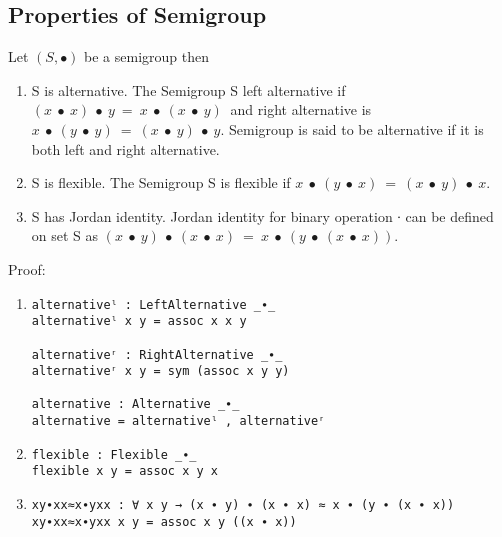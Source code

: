 \subsection{Properties of Semigroup}
Let $(S, ∙)$ be a semigroup then
\begin{enumerate}
\item S is alternative. The Semigroup S left alternative if \((x\ ∙\ x)\ ∙\ y\ =\ x\ ∙\ (x\ ∙\ y)\ \) and right alternative is
\(x\ ∙\ (y\ ∙\ y)\ =\ (x\ ∙\ y)\ ∙\ y\). Semigroup is
said to be alternative if it is both left and right alternative. 
\item S is flexible. The Semigroup S is flexible if \(x\ ∙\ (y\
∙\ x)\ =\ (x\ ∙\ y)\ ∙\ x\).
\item S has Jordan identity.  Jordan identity for binary operation ∙ can be
defined on set S as \((x\ ∙\ y)\ ∙\ (x\ ∙\ x)\ =\
x\ ∙\ (y\ ∙\ (x\ ∙\ x)). \)
\end{enumerate}
Proof:
\begin{enumerate}
\item
\begin{verbatim}
alternativeˡ : LeftAlternative _∙_
alternativeˡ x y = assoc x x y

alternativeʳ : RightAlternative _∙_
alternativeʳ x y = sym (assoc x y y)

alternative : Alternative _∙_
alternative = alternativeˡ , alternativeʳ
\end{verbatim}
 \item
\begin{verbatim}
flexible : Flexible _∙_
flexible x y = assoc x y x
\end{verbatim}
\item
\begin{verbatim}
xy∙xx≈x∙yxx : ∀ x y → (x ∙ y) ∙ (x ∙ x) ≈ x ∙ (y ∙ (x ∙ x))
xy∙xx≈x∙yxx x y = assoc x y ((x ∙ x))
\end{verbatim}
\end{enumerate}
